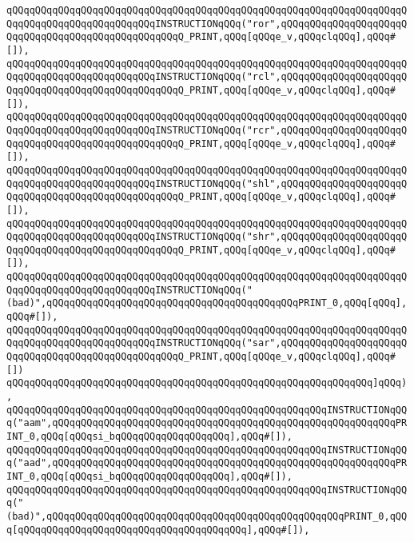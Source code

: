 \verb|qQQqqQQqqQQqqQQqqQQqqQQqqQQqqQQqqQQqqQQqqQQqqQQqqQQqqQQqqQQqqQQqqQQqqQQqqQQqqQQqqQQqqQQqqQQqqQQqINSTRUCTIONqQQq("ror",qQQqqQQqqQQqqQQqqQQqqQQqqQQqqQQqqQQqqQQqqQQqqQQqqQQqQ_PRINT,qQQq[qQQqe_v,qQQqclqQQq],qQQq#[]),|\newline
\verb|qQQqqQQqqQQqqQQqqQQqqQQqqQQqqQQqqQQqqQQqqQQqqQQqqQQqqQQqqQQqqQQqqQQqqQQqqQQqqQQqqQQqqQQqqQQqqQQqINSTRUCTIONqQQq("rcl",qQQqqQQqqQQqqQQqqQQqqQQqqQQqqQQqqQQqqQQqqQQqqQQqqQQqQ_PRINT,qQQq[qQQqe_v,qQQqclqQQq],qQQq#[]),|\newline
\verb|qQQqqQQqqQQqqQQqqQQqqQQqqQQqqQQqqQQqqQQqqQQqqQQqqQQqqQQqqQQqqQQqqQQqqQQqqQQqqQQqqQQqqQQqqQQqqQQqINSTRUCTIONqQQq("rcr",qQQqqQQqqQQqqQQqqQQqqQQqqQQqqQQqqQQqqQQqqQQqqQQqqQQqQ_PRINT,qQQq[qQQqe_v,qQQqclqQQq],qQQq#[]),|\newline
\verb|qQQqqQQqqQQqqQQqqQQqqQQqqQQqqQQqqQQqqQQqqQQqqQQqqQQqqQQqqQQqqQQqqQQqqQQqqQQqqQQqqQQqqQQqqQQqqQQqINSTRUCTIONqQQq("shl",qQQqqQQqqQQqqQQqqQQqqQQqqQQqqQQqqQQqqQQqqQQqqQQqqQQqQ_PRINT,qQQq[qQQqe_v,qQQqclqQQq],qQQq#[]),|\newline
\verb|qQQqqQQqqQQqqQQqqQQqqQQqqQQqqQQqqQQqqQQqqQQqqQQqqQQqqQQqqQQqqQQqqQQqqQQqqQQqqQQqqQQqqQQqqQQqqQQqINSTRUCTIONqQQq("shr",qQQqqQQqqQQqqQQqqQQqqQQqqQQqqQQqqQQqqQQqqQQqqQQqqQQqQ_PRINT,qQQq[qQQqe_v,qQQqclqQQq],qQQq#[]),|\newline
\verb|qQQqqQQqqQQqqQQqqQQqqQQqqQQqqQQqqQQqqQQqqQQqqQQqqQQqqQQqqQQqqQQqqQQqqQQqqQQqqQQqqQQqqQQqqQQqqQQqINSTRUCTIONqQQq("(bad)",qQQqqQQqqQQqqQQqqQQqqQQqqQQqqQQqqQQqqQQqqQQqPRINT_0,qQQq[qQQq],qQQq#[]),|\newline
\verb|qQQqqQQqqQQqqQQqqQQqqQQqqQQqqQQqqQQqqQQqqQQqqQQqqQQqqQQqqQQqqQQqqQQqqQQqqQQqqQQqqQQqqQQqqQQqqQQqINSTRUCTIONqQQq("sar",qQQqqQQqqQQqqQQqqQQqqQQqqQQqqQQqqQQqqQQqqQQqqQQqqQQqQ_PRINT,qQQq[qQQqe_v,qQQqclqQQq],qQQq#[])|\newline
\verb|qQQqqQQqqQQqqQQqqQQqqQQqqQQqqQQqqQQqqQQqqQQqqQQqqQQqqQQqqQQqqQQq]qQQq),|\newline
\verb|qQQqqQQqqQQqqQQqqQQqqQQqqQQqqQQqqQQqqQQqqQQqqQQqqQQqqQQqINSTRUCTIONqQQq("aam",qQQqqQQqqQQqqQQqqQQqqQQqqQQqqQQqqQQqqQQqqQQqqQQqqQQqqQQqqQQqPRINT_0,qQQq[qQQqsi_bqQQqqQQqqQQqqQQqqQQq],qQQq#[]),|\newline
\verb|qQQqqQQqqQQqqQQqqQQqqQQqqQQqqQQqqQQqqQQqqQQqqQQqqQQqqQQqINSTRUCTIONqQQq("aad",qQQqqQQqqQQqqQQqqQQqqQQqqQQqqQQqqQQqqQQqqQQqqQQqqQQqqQQqqQQqPRINT_0,qQQq[qQQqsi_bqQQqqQQqqQQqqQQqqQQq],qQQq#[]),|\newline
\verb|qQQqqQQqqQQqqQQqqQQqqQQqqQQqqQQqqQQqqQQqqQQqqQQqqQQqqQQqINSTRUCTIONqQQq("(bad)",qQQqqQQqqQQqqQQqqQQqqQQqqQQqqQQqqQQqqQQqqQQqqQQqqQQqPRINT_0,qQQq[qQQqqQQqqQQqqQQqqQQqqQQqqQQqqQQqqQQqqQQq],qQQq#[]),|\newline
